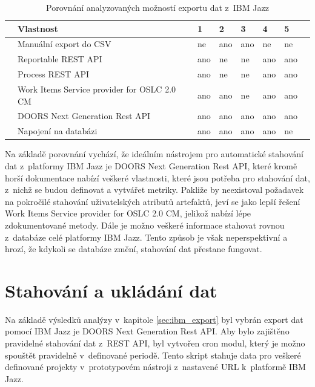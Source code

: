 \documentclass[czech,master]{diploma}
\begin{document}
\begin{table}[htp]
\centering
\begin{tabular}{@{}llllllll@{}}
\toprule
 & \textbf{Vlastnost}                          & \textbf{1} & \textbf{2} & \textbf{3} & \textbf{4} & \textbf{5} &  \\ \midrule
 & Manuální export do CSV                      & ne         & ano        & ano        & ne         & ne         &  \\
 & Reportable REST API                         & ano        & ne         & ne         & ano        & ano        &  \\
 & Process REST API                            & ano        & ne         & ne         & ano        & ano        &  \\
 & Work Items Service provider for OSLC 2.0 CM & ano        & ano        & ne         & ano        & ano        &  \\
 & DOORS Next Generation Rest API              & ano        & ano        & ano        & ano        & ano        &  \\
 & Napojení na databázi                        & ano        & ano        & ano        & ano        & ne         &  \\ \bottomrule
\end{tabular}
\caption{Porovnání analyzovaných možností exportu dat z~IBM Jazz}
\label{tab:ibm_jazz_export}
\end{table}

Na základě porovnání vychází, že ideálním nástrojem pro automatické stahování dat z~platformy IBM Jazz je  DOORS Next Generation Rest API, které kromě horší dokumentace nabízí veškeré vlastnosti, které jsou potřeba pro stahování dat, z~nichž se budou definovat a vytvářet metriky. Pakliže by neexistoval požadavek na pokročilé stahování uživatelských atributů artefaktů, jeví se jako lepší řešení Work Items Service provider for OSLC 2.0 CM, jelikož nabízí lépe zdokumentované metody. Dále je možno veškeré informace stahovat rovnou z~databáze celé platformy IBM Jazz. Tento způsob je však neperspektivní a hrozí, že kdykoli se databáze změní, stahování dat přestane fungovat.

\section{Stahování a ukládání dat}
Na základě výsledků analýzy v~kapitole \ref{sec:ibm_export} byl vybrán export dat pomocí IBM Jazz je  DOORS Next Generation Rest API. Aby bylo zajištěno pravidelné stahování dat z~REST API, byl vytvořen cron modul, který je možno spouštět pravidelně v~definované periodě. Tento skript stahuje data pro veškeré definované projekty v~prototypovém nástroji z~nastavené URL k~platformě IBM Jazz.
\end{document}

